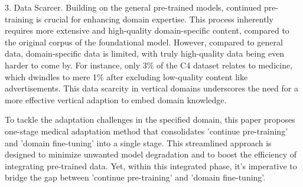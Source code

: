 \documentclass{article} %
\begin{document}
{%

3. Data Scarcer. Building on the general pre-trained models, continued pre-training is crucial for enhancing domain expertise. This process inherently requires more extensive and high-quality domain-specific content, compared to the original corpus of the foundational model. However, compared to general data,  domain-specific data is limited, with truly high-quality data being even harder to come by. For instance, only 3\% of the C4 dataset relates to medicine, which dwindles to mere 1\% after excluding low-quality content like advertisements. This data scarcity in vertical domains underscores the need for a more effective vertical adaption to embed domain knowledge.




To tackle the adaptation challenges in the specified domain, this paper proposes one-stage medical adaptation method that consolidates 'continue pre-training' and 'domain fine-tuning' into a single stage. This streamlined approach is designed to minimize unwanted model degradation and to boost the efficiency of integrating pre-trained data. Yet, within this integrated phase, it's imperative to bridge the gap between 'continue pre-training' and 'domain fine-tuning'.
}
\end{document}
